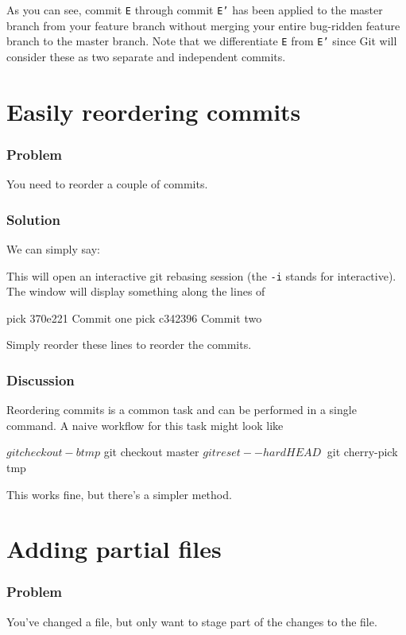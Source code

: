 \documentclass[12pt]{report}
\newcommand\code[1]{{\color{blue}\texttt{#1}}}
\begin{document}
As you can see, commit \texttt{E} through commit \texttt{E'} has been applied to the master branch from your feature branch without merging your entire bug-ridden feature branch to the master branch.  Note that we differentiate \texttt{E} from \texttt{E'} since Git will consider these as two separate and independent commits.

\section{Easily reordering commits}

\subsubsection*{Problem}
You need to reorder a couple of commits.
\subsubsection*{Solution}
We can simply say:

This will open an interactive git rebasing session (the \code{-i}
stands for interactive). The window will display something along the
lines of
\begin{blockcode}
pick 370e221 Commit one
pick c342396 Commit two
\end{blockcode}
Simply reorder these lines to reorder the commits.

\subsubsection*{Discussion}

Reordering commits is a common task and can be performed in a single command. 
A naive workflow for this task might look like
\begin{badblockcode}
$ git checkout -b tmp
$ git checkout master
$ git reset --hard HEAD~
$ git cherry-pick tmp
\end{badblockcode}

This works fine, but there’s a simpler method.

\section{Adding partial files}
\subsubsection*{Problem}
You've changed a file, but only want to stage part of the changes to
the file.
\end{document}
